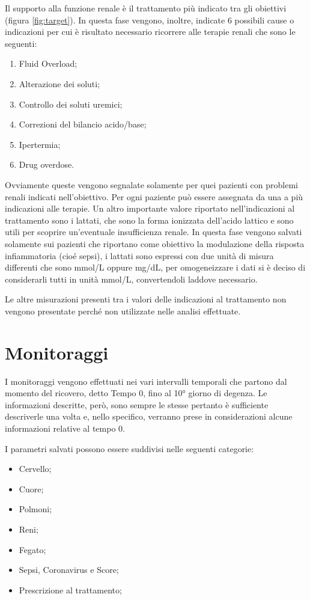 Il supporto alla funzione renale è il trattamento più indicato tra gli obiettivi (figura \ref{fig:target}). In questa fase vengono, inoltre,  indicate 6 possibili cause o  indicazioni per cui è risultato necessario ricorrere alle terapie renali che sono le seguenti:
\begin{enumerate}
	 \parsep
	\item   Fluid Overload;
	\item  Alterazione dei soluti;
	\item  Controllo dei soluti uremici;
	\item  Correzioni del bilancio acido/base;
	\item   Ipertermia;
	\item Drug overdose.
\end{enumerate}
Ovviamente queste vengono segnalate solamente per quei pazienti con problemi renali indicati nell'obiettivo.
Per ogni paziente può essere assegnata da una a più indicazioni alle terapie.
Un altro importante valore riportato nell'indicazioni al trattamento sono i lattati, che sono la forma ionizzata dell'acido lattico e sono utili per scoprire un'eventuale insufficienza renale.  
In questa fase vengono salvati solamente sui pazienti che riportano come obiettivo la modulazione della risposta infiammatoria (cioé sepsi), i lattati sono espressi con due unità di misura differenti che sono mmol/L oppure mg/dL, per omogeneizzare i dati si è deciso di considerarli tutti in unità mmol/L, convertendoli laddove necessario.

Le altre misurazioni presenti tra i valori delle indicazioni al trattamento non vengono presentate perché non utilizzate nelle analisi effettuate.

\section{Monitoraggi}

I monitoraggi vengono effettuati nei vari intervalli temporali che partono dal momento del ricovero, detto Tempo 0, fino al 10° giorno di degenza.
Le informazioni descritte, però, sono sempre le stesse pertanto è sufficiente descriverle una volta e, nello specifico, verranno prese in considerazioni alcune informazioni relative al tempo 0.

I parametri salvati possono essere suddivisi nelle seguenti categorie:
\begin{itemize}
	 \parsep
	\item Cervello;
	\item Cuore;
	\item Polmoni;
	\item Reni;
	\item Fegato;
	\item Sepsi, Coronavirus e Score;
	\item Prescrizione al trattamento;
\end{itemize}

